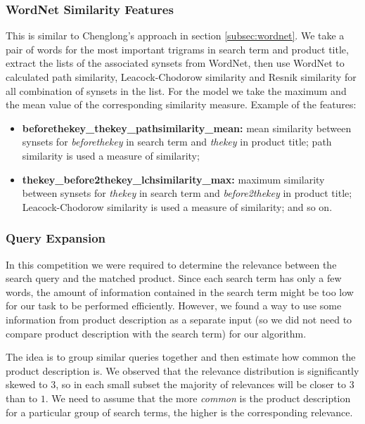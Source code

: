 \documentclass[12pt]{article}
\begin{document}
{{\subsubsection{WordNet Similarity Features}
\label{subsubsec:wordnet_IandK}

This is similar to Chenglong's approach in section \ref{subsec:wordnet}. We take a pair of words for the most important trigrams in search term and product title, extract the lists of the associated synsets from WordNet, then use WordNet to calculated path similarity, Leacock-Chodorow similarity and Resnik similarity for all combination of synsets in the list. For the model we take the maximum and the mean value of the corresponding similarity measure.  Example of the features:
\begin{itemize}
\item \textbf{beforethekey\_thekey\_pathsimilarity\_mean:} mean similarity between synsets for \emph{beforethekey} in search term and  \emph{thekey} in product title; path similarity is used a measure of similarity;
\item \textbf{thekey\_before2thekey\_lchsimilarity\_max:} maximum similarity between synsets for \emph{thekey} in search term and  \emph{before2thekey} in product title; Leacock-Chodorow similarity is used a measure of similarity; and so on.
\end{itemize}

\subsubsection{Query Expansion}
\label{subsubsec:queryexpansion_IandK}

In this competition we were required to determine the relevance between the search query and the matched product. Since each search term has only a few words, the amount of information contained in the search term might be too low for our task to be performed efficiently. However, we found a way to use some information from product description as a separate input (so we did not need to compare product description with the search term) for our algorithm.

The idea is to group similar queries together and then estimate how common the product description is. We observed that the relevance distribution is significantly skewed to $3$, so in each small subset the majority of relevances will be closer to $3$ than to $1$. We need to assume that the more \emph{common} is the product description for a particular group of search terms, the higher is the corresponding relevance.

}}
\end{document}
